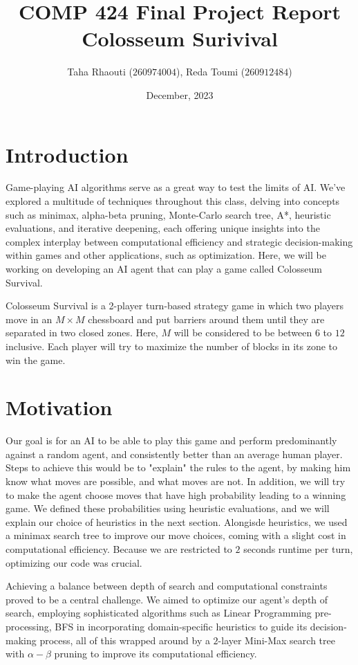 \documentclass[11pt]{article}
\title{COMP 424 Final Project Report \\ Colosseum Surivival}
\author{Taha Rhaouti ($260974004$), Reda Toumi ($260912484$)}
\date{December, 2023}
\begin{document}
\maketitle

\section{Introduction}

Game-playing AI algorithms serve as a great way to test the limits of AI. We've explored 
a multitude of techniques throughout this class, delving into concepts such as minimax, alpha-beta pruning, 
Monte-Carlo search tree, A*, heuristic evaluations, and iterative deepening, each offering unique insights into the complex interplay 
between computational efficiency and strategic decision-making within games and other applications, such as optimization. Here, we will be working on developing
an AI agent that can play a game called Colosseum Survival.

Colosseum Survival is a 2-player turn-based strategy game in which two players move in an $M\times M$ chessboard and put barriers
around them until they are separated in two closed zones. Here, $M$ will be considered to be between $6$ to $12$ inclusive.
Each player will try to maximize the number of blocks in its zone to win the game.


\section{Motivation}

Our goal is for an AI to be able to play this game and perform predominantly against a random agent, and consistently better than an average human player. Steps to achieve this would be to "explain" the rules
to the agent, by making him know what moves are possible, and what moves are not. In addition, we will try to make the agent choose moves that have high probability
leading to a winning game. We defined these probabilities using heuristic evaluations, and we will explain our choice of heuristics in the next section. Alongisde heuristics, we used a minimax search
tree to improve our move choices, coming with a slight cost in computational efficiency. Because we are restricted to $2$ seconds runtime per turn, optimizing our code was crucial.

Achieving a balance between depth of search and computational constraints proved to be a central challenge. We aimed to optimize our agent's depth of search, employing sophisticated algorithms such as Linear
Programming pre-processing, BFS in incorporating domain-specific heuristics to guide its decision-making process, all of this wrapped around by a $2$-layer Mini-Max search tree with $\alpha - \beta$ pruning to improve its computational efficiency.
\end{document}

